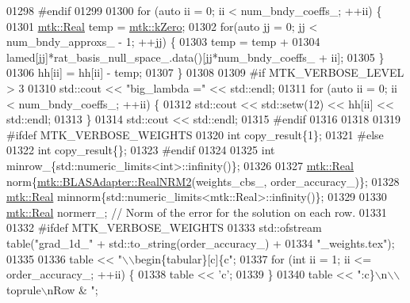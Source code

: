 \begin{DoxyCode}
{{01298 \textcolor{preprocessor}{    #endif}
01299 
01300     \textcolor{keywordflow}{for} (\textcolor{keyword}{auto} ii = 0; ii < num\_bndy\_coeffs\_; ++ii) \{
01301       \hyperlink{group__c01-roots_gac080bbbf5cbb5502c9f00405f894857d}{mtk::Real} temp = \hyperlink{group__c01-roots_ga59a451a5fae30d59649bcda274fea271}{mtk::kZero};
01302       \textcolor{keywordflow}{for}(\textcolor{keyword}{auto} jj = 0; jj < num\_bndy\_approxs\_ - 1; ++jj) \{
01303         temp = temp +
01304           lamed[jj]*rat\_basis\_null\_space\_.data()[jj*num\_bndy\_coeffs\_ + ii];
01305       \}
01306       hh[ii] = hh[ii] - temp;
01307     \}
01308 
01309 \textcolor{preprocessor}{    #if MTK\_VERBOSE\_LEVEL > 3}
01310     std::cout << \textcolor{stringliteral}{"big\_lambda ="} << std::endl;
01311     \textcolor{keywordflow}{for} (\textcolor{keyword}{auto} ii = 0; ii < num\_bndy\_coeffs\_; ++ii) \{
01312       std::cout << std::setw(12) << hh[ii] << std::endl;
01313     \}
01314     std::cout << std::endl;
01315 \textcolor{preprocessor}{    #endif}
01316 
01318 
01319 \textcolor{preprocessor}{    #ifdef MTK\_VERBOSE\_WEIGHTS}
01320     \textcolor{keywordtype}{int} copy\_result\{1\};
01321 \textcolor{preprocessor}{    #else}
01322     \textcolor{keywordtype}{int} copy\_result\{\};
01323 \textcolor{preprocessor}{    #endif}
01324 
01325     \textcolor{keywordtype}{int} minrow\_\{std::numeric\_limits<int>::infinity()\};
01326 
01327     \hyperlink{group__c01-roots_gac080bbbf5cbb5502c9f00405f894857d}{mtk::Real} norm\{\hyperlink{classmtk_1_1BLASAdapter_ab92440888b730863244c5d9479c11aca}{mtk::BLASAdapter::RealNRM2}(weights\_cbs\_,
      order\_accuracy\_)\};
01328     \hyperlink{group__c01-roots_gac080bbbf5cbb5502c9f00405f894857d}{mtk::Real} minnorm\{std::numeric\_limits<mtk::Real>::infinity()\};
01329 
01330     \hyperlink{group__c01-roots_gac080bbbf5cbb5502c9f00405f894857d}{mtk::Real} normerr\_; \textcolor{comment}{// Norm of the error for the solution on each row.}
01331 
01332 \textcolor{preprocessor}{    #ifdef MTK\_VERBOSE\_WEIGHTS}
01333     std::ofstream table(\textcolor{stringliteral}{"grad\_1d\_"} + std::to\_string(order\_accuracy\_) +
01334       \textcolor{stringliteral}{"\_weights.tex"});
01335 
01336     table << \textcolor{stringliteral}{"\(\backslash\)\(\backslash\)begin\{tabular\}[c]\{c"};
01337     \textcolor{keywordflow}{for} (\textcolor{keywordtype}{int} ii = 1; ii <= order\_accuracy\_; ++ii) \{
01338       table << \textcolor{charliteral}{'c'};
01339     \}
01340     table << \textcolor{stringliteral}{":c\}\(\backslash\)n\(\backslash\)\(\backslash\)toprule\(\backslash\)nRow & "};
}}
\end{DoxyCode}

